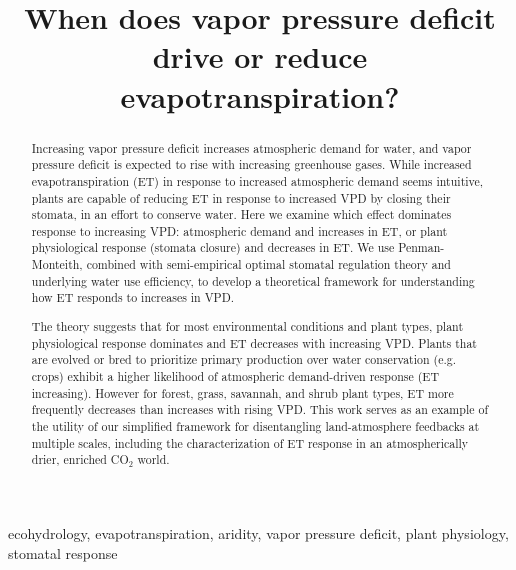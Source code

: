 \documentclass[draft,linenumbers]{afmjournal}
\begin{document}
\title{When does vapor pressure deficit drive or reduce
  evapotranspiration?}



 


\begin{abstract}
  Increasing vapor pressure deficit increases atmospheric demand for  water, and vapor pressure deficit is expected to rise with  increasing greenhouse gases. While increased evapotranspiration (ET) in  response to increased atmospheric demand seems intuitive, plants are  capable of reducing ET in response to increased VPD by closing their  stomata, in an effort to conserve water. Here we examine which  effect dominates response to increasing VPD: atmospheric demand and  increases in ET, or plant physiological response (stomata closure)  and decreases in ET. We use Penman-Monteith, combined with  semi-empirical optimal stomatal regulation theory and underlying  water use efficiency, to develop a theoretical framework for  understanding how ET responds to increases in VPD.

  The theory suggests that for most environmental conditions and plant  types, plant physiological response dominates and ET decreases with  increasing VPD. Plants that are evolved or bred to prioritize  primary production over water conservation (e.g. crops) exhibit a  higher likelihood of atmospheric demand-driven response (ET  increasing). However for forest, grass, savannah, and shrub plant  types, ET more frequently decreases than increases with rising  VPD. This work serves as an example of the utility of  our simplified framework for disentangling land-atmosphere feedbacks  at multiple scales, including the characterization of ET response in  an atmospherically drier, enriched CO$_2$ world. 
\end{abstract}

\begin{keypoints}
\item ecohydrology, evapotranspiration, aridity, vapor pressure
  deficit, plant physiology, stomatal response
\end{keypoints}


\end{document}
